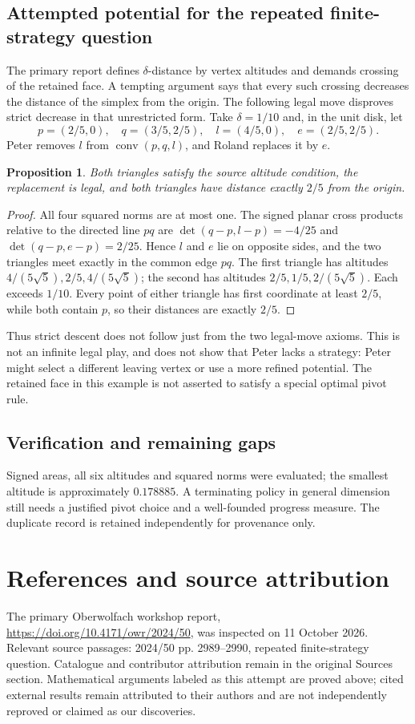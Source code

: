 \documentclass[11pt]{article}
\newtheorem{proposition}{Proposition}
\begin{document}
\subsection{Attempted potential for the repeated finite-strategy question}
The primary report defines $\delta$-distance by vertex altitudes and demands crossing of the retained face. A tempting argument says that every such crossing decreases the distance of the simplex from the origin. The following legal move disproves strict decrease in that unrestricted form.
Take $\delta=1/10$ and, in the unit disk, let
\[
 p=(2/5,0),\quad q=(3/5,2/5),\quad l=(4/5,0),\quad e=(2/5,2/5).
\]
Peter removes $l$ from $\operatorname{conv}(p,q,l)$, and Roland replaces it by $e$.
\begin{proposition}
Both triangles satisfy the source altitude condition, the replacement is legal, and both triangles have distance exactly $2/5$ from the origin.
\end{proposition}
\begin{proof}
All four squared norms are at most one. The signed planar cross products relative to the directed line $p q$ are
$\det(q-p,l-p)=-4/25$ and $\det(q-p,e-p)=2/25$.
Hence $l$ and $e$ lie on opposite sides, and the two triangles meet exactly in the common edge $p q$. The first triangle has altitudes $4/(5\sqrt5),2/5,4/(5\sqrt5)$; the second has altitudes $2/5,1/5,2/(5\sqrt5)$. Each exceeds $1/10$. Every point of either triangle has first coordinate at least $2/5$, while both contain $p$, so their distances are exactly $2/5$.
\end{proof}
Thus strict descent does not follow just from the two legal-move axioms. This is not an infinite legal play, and does not show that Peter lacks a strategy: Peter might select a different leaving vertex or use a more refined potential. The retained face in this example is not asserted to satisfy a special optimal pivot rule.
\subsection{Verification and remaining gaps}
Signed areas, all six altitudes and squared norms were evaluated; the smallest altitude is approximately $0.178885$. A terminating policy in general dimension still needs a justified pivot choice and a well-founded progress measure. The duplicate record is retained independently for provenance only.

\section{References and source attribution}
The primary Oberwolfach workshop report, \url{https://doi.org/10.4171/owr/2024/50}, was inspected on 11 October 2026. Relevant source passages: 2024/50 pp. 2989--2990, repeated finite-strategy question. Catalogue and contributor attribution remain in the original Sources section. Mathematical arguments labeled as this attempt are proved above; cited external results remain attributed to their authors and are not independently reproved or claimed as our discoveries.
\end{document}

